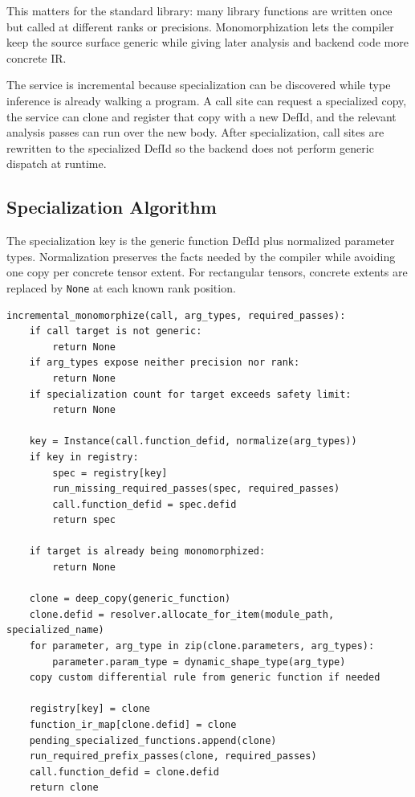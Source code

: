 This matters for the standard library: many library functions are written once
but called at different ranks or precisions. Monomorphization lets the compiler
keep the source surface generic while giving later analysis and backend code
more concrete IR.

The service is incremental because specialization can be discovered while type
inference is already walking a program. A call site can request a specialized
copy, the service can clone and register that copy with a new DefId, and the
relevant analysis passes can run over the new body. After specialization, call
sites are rewritten to the specialized DefId so the backend does not perform
generic dispatch at runtime.

\subsection{Specialization Algorithm}

The specialization key is the generic function DefId plus normalized parameter
types. Normalization preserves the facts needed by the compiler while avoiding
one copy per concrete tensor extent. For rectangular tensors, concrete extents
are replaced by \texttt{None} at each known rank position.

\begin{lstlisting}[style=pythoncode,caption={Incremental monomorphization.}]
incremental_monomorphize(call, arg_types, required_passes):
    if call target is not generic:
        return None
    if arg_types expose neither precision nor rank:
        return None
    if specialization count for target exceeds safety limit:
        return None

    key = Instance(call.function_defid, normalize(arg_types))
    if key in registry:
        spec = registry[key]
        run_missing_required_passes(spec, required_passes)
        call.function_defid = spec.defid
        return spec

    if target is already being monomorphized:
        return None

    clone = deep_copy(generic_function)
    clone.defid = resolver.allocate_for_item(module_path, specialized_name)
    for parameter, arg_type in zip(clone.parameters, arg_types):
        parameter.param_type = dynamic_shape_type(arg_type)
    copy custom differential rule from generic function if needed

    registry[key] = clone
    function_ir_map[clone.defid] = clone
    pending_specialized_functions.append(clone)
    run_required_prefix_passes(clone, required_passes)
    call.function_defid = clone.defid
    return clone
\end{lstlisting}

